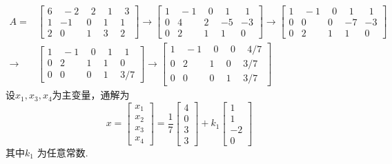\documentclass[a4paper]{book}
\begin{document}
\begin{displaymath}
\begin{aligned}
A=&\begin{bmatrix} 6&\ -2&\ \ 2&\ \ 1&\ \ 3\\1&-1&0&1&1\\2&0&1&3&2 \end{bmatrix}\rightarrow
\begin{bmatrix}1&\ -1&\ \ 0&\ \ 1&\ \ 1\\0&4&2&-5&-3\\0&2&1&1&0  \end{bmatrix}\rightarrow
\begin{bmatrix} 1&\ -1&\ \ 0&\ \ 1&\ \ 1\\0&0&0&-7&-3\\0&2&1&1&0 \end{bmatrix}\\ \rightarrow&
\begin{bmatrix}1&\ -1&\ \ 0&\ \ 1&\ \ 1\\0&2&1&1&0\\0&0&0&1&3/7  \end{bmatrix} \rightarrow
\begin{bmatrix}1&\ -1&\ \ 0&\ \ 0&\ \ 4/7\\0&2&1&0&3/7\\0&0&0&1&3/7  \end{bmatrix}
\end{aligned} \end{displaymath}
设$x_1,x_3,x_4$为主变量，通解为
\begin{displaymath}
x=\begin{bmatrix}x_1\\x_2\\x_3\\x_4\end{bmatrix}=\frac{1}{7}\begin{bmatrix}4\\0\\3\\3\end{bmatrix}
+k_1\begin{bmatrix}1\\1\\-2\\0\end{bmatrix}
\end{displaymath}
其中$k_1$ 为任意常数.
\end{document}
